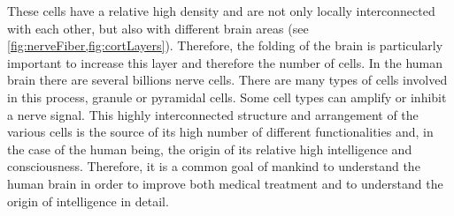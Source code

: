 These cells have a relative high density and are not only locally interconnected with each other, but also with different brain areas (see \cref{fig:nerveFiber,fig:cortLayers}).
Therefore, the folding of the brain is particularly important to increase this layer and therefore the number of cells.
In the human brain there are several billions nerve cells.
There are many types of cells involved in this process, \eg{} granule or pyramidal cells.
Some cell types can amplify or inhibit a nerve signal.
This highly interconnected structure and arrangement of the various cells is the source of its high number of different functionalities and, in the case of the human being, the origin of its relative high intelligence and consciousness.
Therefore, it is a common goal of mankind to understand the human brain in order to improve both medical treatment and to understand the origin of intelligence in detail.
% 
% 
% 
